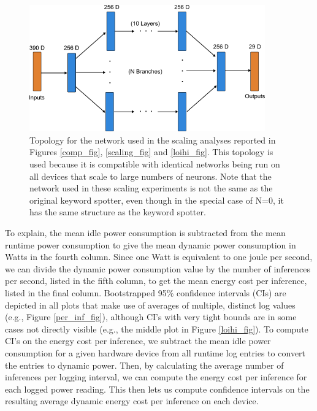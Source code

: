 \documentclass[sigconf, screen]{acmart}
\begin{document}
\begin{figure}[ht!]
\centering
    \includegraphics[width=4in]{./figures/scaled_network.png}
    \caption{Topology for the network used in the scaling analyses reported in Figures \ref{comp_fig}, \ref{scaling_fig} and \ref{loihi_fig}. This topology is used because it is compatible with identical networks being run on all devices that scale to large numbers of neurons. Note that the network used in these scaling experiments is not the same as the original keyword spotter, even though in the special case of N=0, it has the same structure as the keyword spotter.}
\label{scaled_network_fig}
\end{figure}

To explain, the mean idle power consumption is subtracted from the mean runtime power consumption to give the mean dynamic power consumption in Watts in the fourth column. Since one Watt is equivalent to one joule per second, we can divide the dynamic power consumption value by the number of inferences per second, listed in the fifth column, to get the mean energy cost per inference, listed in the final column. Bootstrapped 95\% confidence intervals (CIs) are depicted in all plots that make use of averages of multiple, distinct log values (e.g., Figure \ref{per_inf_fig}), although CI's with very tight bounds are in some cases not directly visible (e.g., the middle plot in Figure \ref{loihi_fig}). To compute CI's on the energy cost per inference, we subtract the mean idle power consumption for a given hardware device from all runtime log entries to convert the entries to dynamic power. Then, by calculating the average number of inferences per logging interval, we can compute the energy cost per inference for each logged power reading. This then lets us compute confidence intervals on the resulting average dynamic energy cost per inference on each device.
\end{document}
